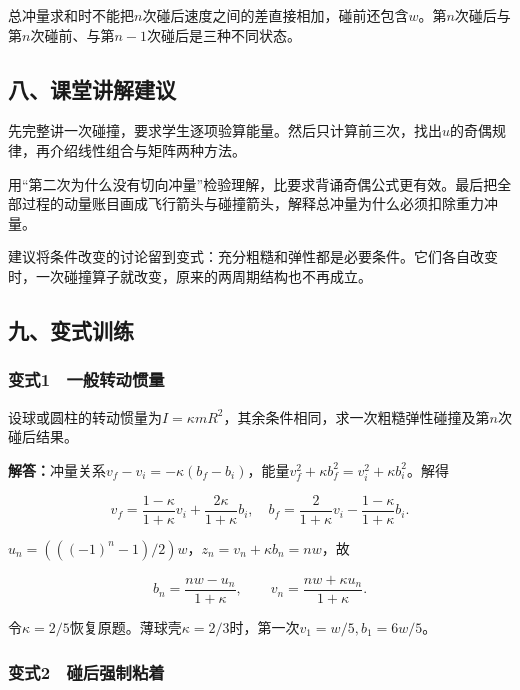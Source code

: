 \documentclass[12pt,a4paper,fontset=fandol]{ctexart}
\begin{document}
总冲量求和时不能把\(n\)次碰后速度之间的差直接相加，碰前还包含\(w\)。第\(n\)次碰后与第\(n\)次碰前、与第\(n-1\)次碰后是三种不同状态。

\subsection{八、课堂讲解建议}\label{ux516bux8bfeux5802ux8bb2ux89e3ux5efaux8bae-2}

先完整讲一次碰撞，要求学生逐项验算能量。然后只计算前三次，找出\(u\)的奇偶规律，再介绍线性组合与矩阵两种方法。

用``第二次为什么没有切向冲量''检验理解，比要求背诵奇偶公式更有效。最后把全部过程的动量账目画成飞行箭头与碰撞箭头，解释总冲量为什么必须扣除重力冲量。

建议将条件改变的讨论留到变式：充分粗糙和弹性都是必要条件。它们各自改变时，一次碰撞算子就改变，原来的两周期结构也不再成立。

\subsection{九、变式训练}\label{ux4e5dux53d8ux5f0fux8badux7ec3-2}

\subsubsection{变式1　一般转动惯量}\label{ux53d8ux5f0f1-ux4e00ux822cux8f6cux52a8ux60efux91cf}

设球或圆柱的转动惯量为\(I=\kappa mR^2\)，其余条件相同，求一次粗糙弹性碰撞及第\(n\)次碰后结果。

\textbf{解答：}冲量关系\(v_f-v_i=-\kappa(b_f-b_i)\)，能量\(v_f^2+\kappa b_f^2=v_i^2+\kappa b_i^2\)。解得

\[
v_f=\frac{1-\kappa}{1+\kappa}v_i
+\frac{2\kappa}{1+\kappa}b_i,\quad
b_f=\frac2{1+\kappa}v_i-\frac{1-\kappa}{1+\kappa}b_i.
\]

\(u_n=(((-1)^n-1)/2)w\)，\(z_n=v_n+\kappa b_n=nw\)，故

\[
b_n=\frac{nw-u_n}{1+\kappa},\qquad
v_n=\frac{nw+\kappa u_n}{1+\kappa}.
\]

令\(\kappa=2/5\)恢复原题。薄球壳\(\kappa=2/3\)时，第一次\(v_1=w/5,b_1=6w/5\)。

\subsubsection{变式2　碰后强制粘着}\label{ux53d8ux5f0f2-ux78b0ux540eux5f3aux5236ux7c98ux7740}
\end{document}
